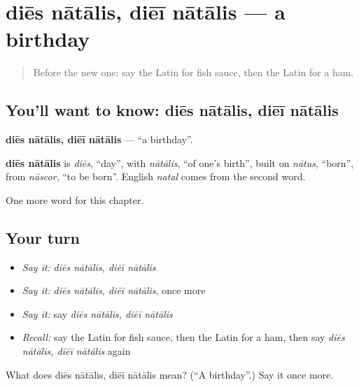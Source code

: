 \section[diēs nātālis, diēī nātālis]{diēs nātālis, diēī nātālis — a birthday}

\label{lesson:LA-C195-dies-natalis}



\begin{quote}
Before the new one: say the Latin for fish sauce, then the Latin for a ham.
\end{quote}

\subsection*{You'll want to know: diēs nātālis, diēī nātālis}
\textbf{diēs nātālis, diēī nātālis} — \textquotedblleft{}a birthday\textquotedblright{}.

\begin{cousinweb}
\textbf{diēs nātālis} is \emph{diēs}, \textquotedblleft{}day\textquotedblright{}, with \emph{nātālis}, \textquotedblleft{}of one's birth\textquotedblright{}, built on \emph{nātus}, \textquotedblleft{}born\textquotedblright{}, from \emph{nāscor}, \textquotedblleft{}to be born\textquotedblright{}. English \emph{natal} comes from the second word.
\end{cousinweb}

\begin{grammarlens}[title={What you've built}]
One more word for this chapter.
\end{grammarlens}

\subsection*{Your turn}
\begin{itemize}
\raggedright
  \item \emph{Say it:} \emph{diēs nātālis, diēī nātālis}
  \item \emph{Say it:} \emph{diēs nātālis, diēī nātālis}, once more
  \item \emph{Say it:} say \emph{diēs nātālis, diēī nātālis}
  \item \emph{Recall:} say the Latin for fish sauce, then the Latin for a ham, then say \emph{diēs nātālis, diēī nātālis} again
\end{itemize}

\begin{tcolorbox}[breakable,colback=teal!4,colframe=teal!35!black,title={Before you move on}]
What does diēs nātālis, diēī nātālis mean? (\textquotedblleft{}A birthday\textquotedblright{}.) Say it once more.
\end{tcolorbox}
